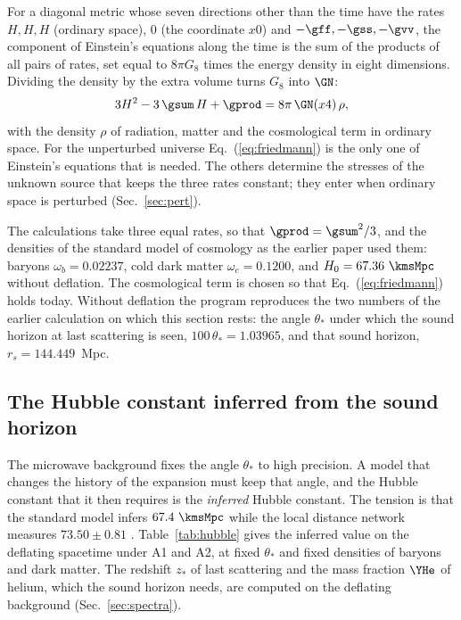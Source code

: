 For a diagonal metric whose seven directions other than the time have the rates $H,H,H$ (ordinary
space), $0$ (the coordinate $x0$) and $-\gff,-\gss,-\gvv$, the component of Einstein's equations
along the time is the sum of the products of all pairs of rates, set equal to $8\pi G_8$ times the
energy density in eight dimensions. Dividing the density by the extra volume turns $G_8$ into $\GN$:
\begin{equation}
3H^{2}-3\,\gsum\,H+\gprod=8\pi\,\GN(x4)\,\rho,
\label{eq:friedmann}
\end{equation}
with the density $\rho$ of radiation, matter and the cosmological term in ordinary space. For the
unperturbed universe Eq.~(\ref{eq:friedmann}) is the only one of Einstein's equations that is
needed. The others determine the stresses of the unknown source that keeps the three rates constant;
they enter when ordinary space is perturbed (Sec.~\ref{sec:pert}).

The calculations take three equal rates, so that $\gprod=\gsum^{2}/3$, and the densities of the
standard model of cosmology \cite{Planck2018VI} as the earlier paper used them: baryons
$\omega_b=0.02237$, cold dark matter $\omega_c=0.1200$, and $H_0=67.36~\kmsMpc$ without deflation.
The cosmological term is chosen so that Eq.~(\ref{eq:friedmann}) holds today. Without deflation the
program reproduces the two numbers of the earlier calculation on which this section rests: the angle
$\theta_*$ under which the sound horizon at last scattering is seen, $100\,\theta_*=1.03965$, and
that sound horizon, $r_s=144.449$~Mpc.

\subsection{The Hubble constant inferred from the sound horizon}

The microwave background fixes the angle $\theta_*$ to high precision. A model that changes the history of the expansion must keep that angle,
and the Hubble constant that it then requires is the \emph{inferred} Hubble constant. The tension is
that the standard model infers $67.4~\kmsMpc$ \cite{Planck2018VI} while the local distance network
measures $73.50\pm0.81$ \cite{H0DN2026}. Table~\ref{tab:hubble} gives the inferred value on the
deflating spacetime under A1 and A2, at fixed $\theta_*$ and fixed densities of baryons and dark
matter. The redshift $z_*$ of last scattering and the mass fraction $\YHe$ of helium, which the sound
horizon needs, are computed on the deflating background (Sec.~\ref{sec:spectra}).

